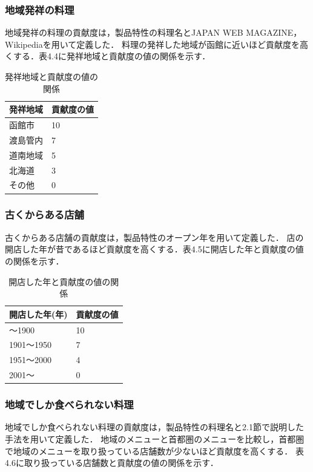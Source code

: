 \documentclass{funthesis}
\begin{document}
\subsubsection{地域発祥の料理}
地域発祥の料理の貢献度は，製品特性の料理名とJAPAN WEB MAGAZINE\cite{12}，Wikipedia\cite{13}を用いて定義した．
料理の発祥した地域が函館に近いほど貢献度を高くする．表4.4に発祥地域と貢献度の値の関係を示す．

\begin{table}[htb]
  \begin{center}
  \scriptsize
    \caption{発祥地域と貢献度の値の関係}
    \normalsize
   \begin{tabular}{p{6cm}|p{6cm}}
    \hline
発祥地域 & 貢献度の値 \\ \hline\hline
      函館市 & 10  \\ \hline
      渡島管内 & 7 \\ \hline
      道南地域 & 5 \\ \hline
      北海道 & 3 \\ \hline
      その他 & 0 \\ \hline
  \end{tabular}
  \end{center}
\end{table}

\subsubsection{古くからある店舗}
古くからある店舗の貢献度は，製品特性のオープン年を用いて定義した．
店の開店した年が昔であるほど貢献度を高くする．表4.5に開店した年と貢献度の値の関係を示す．

\begin{table}[htb]
  \begin{center}
  \scriptsize
    \caption{開店した年と貢献度の値の関係}
    \normalsize
   \begin{tabular}{p{6cm}|p{6cm}}
    \hline
開店した年(年) & 貢献度の値 \\ \hline\hline
      〜1900 & 10  \\ \hline
      1901〜1950 & 7 \\ \hline
      1951〜2000 & 4 \\ \hline
      2001〜 & 0 \\ \hline
  \end{tabular}
  \end{center}
\end{table}

\subsubsection{地域でしか食べられない料理}
地域でしか食べられない料理の貢献度は，製品特性の料理名と2.1節で説明した手法を用いて定義した．
地域のメニューと首都圏のメニューを比較し，首都圏で地域のメニューを取り扱っている店舗数が少ないほど貢献度を高くする．
表4.6に取り扱っている店舗数と貢献度の値の関係を示す．
\end{document}
